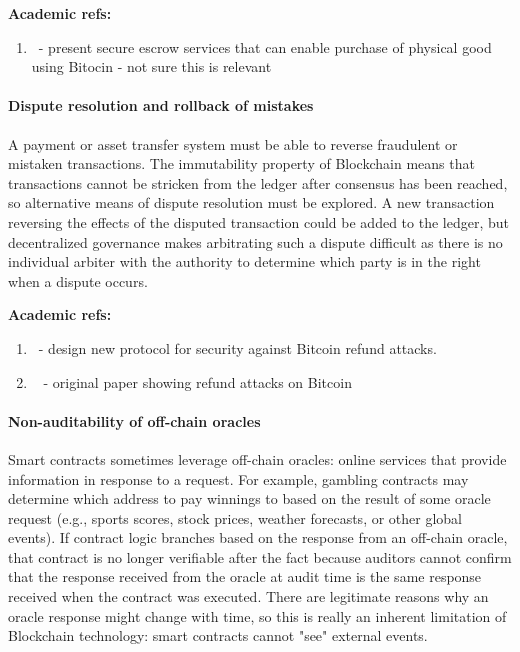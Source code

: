 \noindent
\textbf{Academic refs:}
\begin{enumerate}
\item~\cite{FC:GBGN17}- present secure escrow services that can enable purchase of physical good using Bitocin - not sure this is relevant
\end{enumerate}

\paragraph{Dispute resolution and rollback of mistakes}
A payment or asset transfer system must be able to reverse fraudulent or mistaken transactions. The immutability property of Blockchain means that transactions cannot be stricken from the ledger after consensus has been reached, so alternative means of dispute resolution must be explored. A new transaction reversing the effects of the disputed transaction could be added to the ledger, but decentralized governance makes arbitrating such a dispute difficult as there is no individual arbiter with the authority to determine which party is in the right when a dispute occurs. 

\noindent
\textbf{Academic refs:}
\begin{enumerate}
\item ~\cite{arxiv:AviSafSha18}- design new protocol for security against Bitcoin refund attacks.
\item ~\cite{FC:MccShaHao16} - original paper showing refund attacks on Bitcoin
\end{enumerate}

\paragraph{Non-auditability of off-chain oracles}
Smart contracts sometimes leverage off-chain oracles: online services that provide information in response to a request. For example, gambling contracts may determine which address to pay winnings to based on the result of some oracle request (e.g., sports scores, stock prices, weather forecasts, or other global events). If contract logic branches based on the response from an off-chain oracle, that contract is no longer verifiable after the fact because auditors cannot confirm that the response received from the oracle at audit time is the same response received when the contract was executed. There are legitimate reasons why an oracle response might change with time, so this is really an inherent limitation of Blockchain technology: smart contracts cannot "see" external events.

